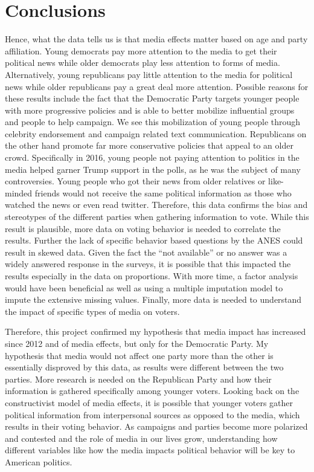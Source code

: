 \documentclass[11pt,]{article}
\begin{document}
\section{Conclusions}\label{conclusions}

Hence, what the data tells us is that media effects matter based on age
and party affiliation. Young democrats pay more attention to the media
to get their political news while older democrats play less attention to
forms of media. Alternatively, young republicans pay little attention to
the media for political news while older republicans pay a great deal
more attention. Possible reasons for these results include the fact that
the Democratic Party targets younger people with more progressive
policies and is able to better mobilize influential groups and people to
help campaign. We see this mobilization of young people through
celebrity endorsement and campaign related text communication.
Republicans on the other hand promote far more conservative policies
that appeal to an older crowd. Specifically in 2016, young people not
paying attention to politics in the media helped garner Trump support in
the polls, as he was the subject of many controversies. Young people who
got their news from older relatives or like-minded friends would not
receive the same political information as those who watched the news or
even read twitter. Therefore, this data confirms the bias and
stereotypes of the different parties when gathering information to vote.
While this result is plausible, more data on voting behavior is needed
to correlate the results. Further the lack of specific behavior based
questions by the ANES could result in skewed data. Given the fact the
``not available'' or no answer was a widely answered response in the
surveys, it is possible that this impacted the results especially in the
data on proportions. With more time, a factor analysis would have been
beneficial as well as using a multiple imputation model to impute the
extensive missing values. Finally, more data is needed to understand the
impact of specific types of media on voters.

Therefore, this project confirmed my hypothesis that media impact has
increased since 2012 and of media effects, but only for the Democratic
Party. My hypothesis that media would not affect one party more than the
other is essentially disproved by this data, as results were different
between the two parties. More research is needed on the Republican Party
and how their information is gathered specifically among younger voters.
Looking back on the constructivist model of media effects, it is
possible that younger voters gather political information from
interpersonal sources as opposed to the media, which results in their
voting behavior. As campaigns and parties become more polarized and
contested and the role of media in our lives grow, understanding how
different variables like how the media impacts political behavior will
be key to American politics.
\end{document}
